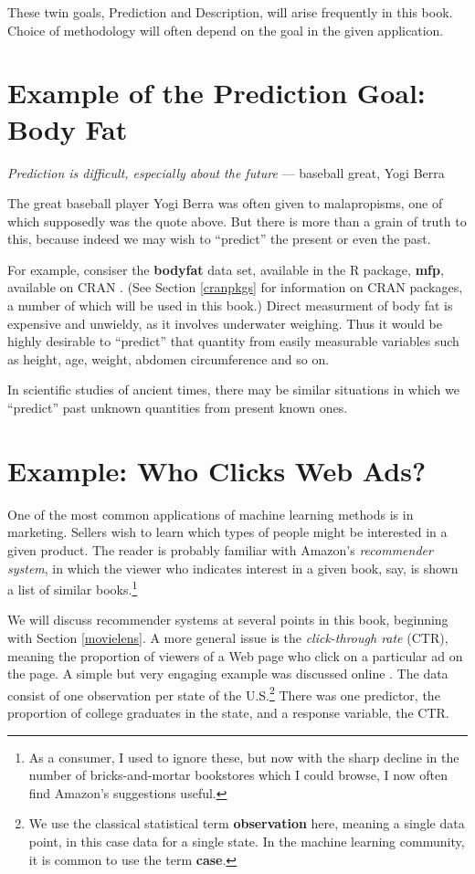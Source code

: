 These twin goals, Prediction and Description, will arise frequently in
this book. Choice of methodology will often depend on the goal in the
given application.

\section{Example of the Prediction Goal:  Body Fat}
\label{bodyfat}

{\it Prediction is difficult, especially about the future} --- baseball
great, Yogi Berra

The great baseball player Yogi Berra was often given to malapropisms,
one of which supposedly was the quote above.  But there is more than
a grain of truth to this, because indeed we may wish to ``predict'' the
present or even the past.

For example, consiser the {\bf bodyfat} data set, available in the R
package, {\bf mfp}, available on CRAN \cite{mfp}.  (See Section
\ref{cranpkgs} for information on CRAN packages, a number of which will
be used in this book.) Direct measurment of body fat is expensive and
unwieldy, as it involves underwater weighing. Thus it would be highly
desirable to ``predict'' that quantity from easily measurable variables
such as height, age, weight, abdomen circumference and so on.

In scientific studies of ancient times, there may be similar situations
in which we ``predict'' past unknown quantities from present known ones.

\section{Example:  Who Clicks Web Ads?}
\label{clicks}

One of the most common applications of machine learning methods is in
marketing.  Sellers wish to learn which types of people might be
interested in a given product.  The reader is probably familiar 
with Amazon's {\it recommender system}, in which the viewer who
indicates interest in a given book, say, is shown a list of similar
books.\footnote{As a consumer, I used to ignore these, but now with the
sharp decline in the number of bricks-and-mortar bookstores which I
could browse, I now often find Amazon's suggestions useful.}

We will discuss recommender systems at several points in this book,
beginning with Section \ref{movielens}.  A more general issue is the
{\it click-through rate} (CTR), meaning the proportion of viewers of a
Web page who click on a particular ad on the page.  A simple but very
engaging example was discussed online \cite{talblog}.
The data consist of one observation per state of the U.S.\footnote{We
use the classical statistical term {\bf observation} here, meaning a
single data point, in this case data for a single state.  In the machine
learning community, it is common to use the term {\bf case}.} There was
one predictor, the proportion of college graduates in the state, and a
response variable, the CTR.

